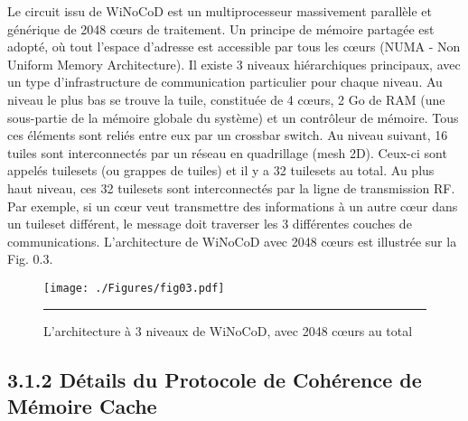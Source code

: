 Le circuit issu de WiNoCoD est un multiprocesseur massivement parallèle et générique de 2048 cœurs de traitement. Un principe de mémoire partagée est adopté, où tout l'espace d'adresse est accessible par tous les cœurs (NUMA - Non Uniform Memory Architecture). Il existe 3 niveaux hiérarchiques principaux, avec un type d'infrastructure de communication particulier pour chaque niveau. Au niveau le plus bas se trouve la tuile, constituée de 4 cœurs, 2 Go de RAM (une sous-partie de la mémoire globale du système) et un contrôleur de mémoire. Tous ces éléments sont reliés entre eux par un crossbar switch. Au niveau suivant, 16 tuiles sont interconnectés par un réseau en quadrillage (mesh 2D). Ceux-ci sont appelés tuilesets (ou grappes de tuiles) et il y a 32 tuilesets au total. Au plus haut niveau, ces 32 tuilesets sont interconnectés par la ligne de transmission RF. Par exemple, si un cœur veut transmettre des informations à un autre cœur dans un tuileset différent, le message doit traverser les 3 différentes couches de communications. L'architecture de WiNoCoD avec 2048 cœurs est illustrée sur la Fig. 0.3.

\begin{figure}[htbp]
  \centering
    \texttt{[image: ./Figures/fig03.pdf]}
    \rule{35em}{0.5pt}
  \caption[L'architecture à 3 niveaux de WiNoCoD, avec 2048 cœurs au total]{L'architecture à 3 niveaux de WiNoCoD, avec 2048 cœurs au total}
  \label{fig:Electron}
\end{figure}

\subsection*{3.1.2 Détails du Protocole de Cohérence de Mémoire Cache}

